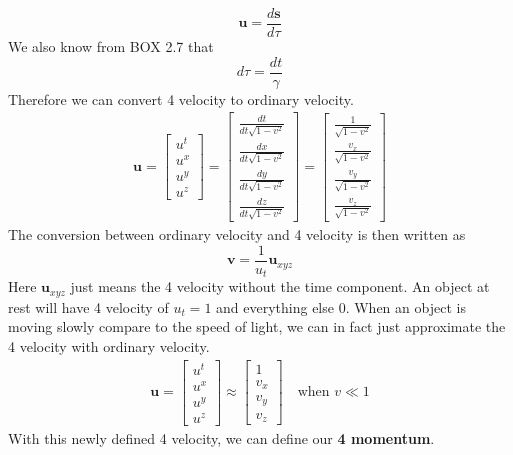 \documentclass[12pt]{book}
\newcommand{\dydx}[2]{\frac{d #1}{d #2}}
\begin{document}
\[
\mathbf{u} = \dydx{\mathbf{s}}{\tau}
\]
We also know from BOX 2.7 that
\[
d\tau = \frac{dt}{\gamma}
\]
Therefore we can convert 4 velocity to ordinary velocity.
\begin{align}
\mathbf{u}= 
\begin{bmatrix}
u^t \\
u^x \\
u^y \\
u^z
\end{bmatrix}
=
\begin{bmatrix}
\frac{dt}{dt\sqrt{1 - v^2}} \\
\frac{dx}{dt\sqrt{1 - v^2}} \\
\frac{dy}{dt\sqrt{1 - v^2}} \\
\frac{dz}{dt\sqrt{1 - v^2}}
\end{bmatrix}
=
\begin{bmatrix}
\frac{1}{\sqrt{1 - v^2}} \\
\frac{v_x}{\sqrt{1 - v^2}} \\
\frac{v_y}{\sqrt{1 - v^2}} \\
\frac{v_z}{\sqrt{1 - v^2}}
\end{bmatrix}
\end{align}
The conversion between ordinary velocity and 4 velocity is then written as
\[
\mathbf{v} = \frac{1}{u_t}\mathbf{u}_{xyz}
\]
Here $\mathbf{u}_{xyz}$ just means the 4 velocity without the time component. An object at rest will have 4 velocity of $u_t = 1$ and everything else $0$. When an object is moving slowly compare to the speed of light, we can in fact just approximate the 4 velocity with ordinary velocity.
\begin{align}
\mathbf{u} = 
\begin{bmatrix}
u^t \\
u^x \\
u^y \\
u^z
\end{bmatrix}
\approx
\begin{bmatrix}
1 \\
v_x \\
v_y \\
v_z
\end{bmatrix}
\quad \text{when } v \ll 1
\end{align}
With this newly defined 4 velocity, we can define our \textbf{4 momentum}. 







        
\end{document}
